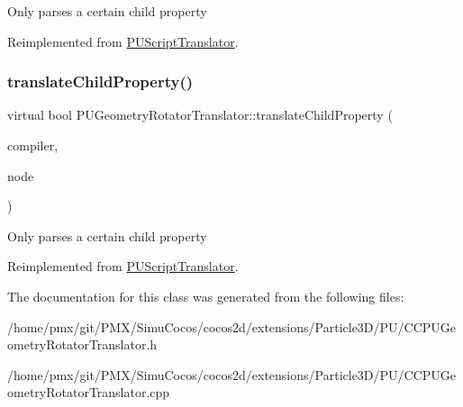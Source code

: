 Only parses a certain child property 

Reimplemented from \hyperlink{classPUScriptTranslator_a0374d83a8a04e57918975d525e0f8fe8}{P\+U\+Script\+Translator}.

\mbox{\label{classPUGeometryRotatorTranslator_a4da3898f78298bd083ab77f829a59340}} 
\subsubsection{\texorpdfstring{translate\+Child\+Property()}{translateChildProperty()}\hspace{0.1cm}{\footnotesize\ttfamily [2/2]}}
{\footnotesize\ttfamily virtual bool P\+U\+Geometry\+Rotator\+Translator\+::translate\+Child\+Property (\begin{DoxyParamCaption}\item[{\hyperlink{classPUScriptCompiler}{P\+U\+Script\+Compiler} $\ast$}]{compiler,  }\item[{\hyperlink{classPUAbstractNode}{P\+U\+Abstract\+Node} $\ast$}]{node }\end{DoxyParamCaption})\hspace{0.3cm}{\ttfamily [virtual]}}

Only parses a certain child property 

Reimplemented from \hyperlink{classPUScriptTranslator_a0374d83a8a04e57918975d525e0f8fe8}{P\+U\+Script\+Translator}.



The documentation for this class was generated from the following files\+:\begin{DoxyCompactItemize}
\item 
/home/pmx/git/\+P\+M\+X/\+Simu\+Cocos/cocos2d/extensions/\+Particle3\+D/\+P\+U/C\+C\+P\+U\+Geometry\+Rotator\+Translator.\+h\item 
/home/pmx/git/\+P\+M\+X/\+Simu\+Cocos/cocos2d/extensions/\+Particle3\+D/\+P\+U/C\+C\+P\+U\+Geometry\+Rotator\+Translator.\+cpp\end{DoxyCompactItemize}
